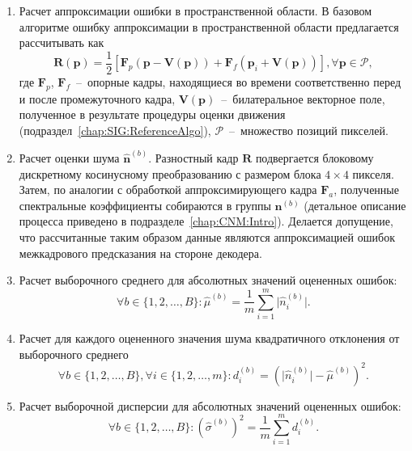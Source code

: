 \begin{enumerate}
  \item Расчет аппроксимации ошибки в пространственной области. В базовом алгоритме ошибку аппроксимации в пространственной области предлагается рассчитывать как 
  \begin{equation*}
    \mathbf{R}(\mathbf{p}) = \frac{1}{2} \left[ \mathbf{F}_p(\mathbf{p}-\mathbf{V}(\mathbf{p})) + \mathbf{F}_f(\mathbf{p}_i+\mathbf{V}(\mathbf{p}))\right], \forall \mathbf{p} \in \mathcal{P},
    \label{eq:NoiseEstimation}
  \end{equation*}  
  где $\mathbf{F}_p$, $\mathbf{F}_f$~--~опорные кадры, находящиеся во времени соответственно перед и после промежуточного кадра, $\mathbf{V}(\mathbf{p})$~--~билатеральное векторное поле, полученное в результате процедуры оценки движения (подраздел~\ref{chap:SIG:ReferenceAlgo}), $\mathcal{P}$~--~множество позиций пикселей.
  
  \item Расчет оценки шума $\hat{\mathbf{n}}^{(b)}$. Разностный кадр $\mathbf{R}$ подвергается блоковому дискретному косинусному преобразованию с размером блока $4 \times 4$ пикселя. Затем, по аналогии с обработкой аппроксимирующего кадра $\mathbf{F}_a$, полученные спектральные коэффициенты собираются в группы $\mathbf{n}^{(b)}$ (детальное описание процесса приведено в подразделе~\ref{chap:CNM:Intro}). Делается допущение, что рассчитанные таким образом данные являются аппроксимацией ошибок межкадрового предсказания на стороне декодера.
  
  \item Расчет выборочного среднего для абсолютных значений оцененных ошибок:
  \begin{equation*}
  \forall b \in \{1,2,\ldots, B\}: \hat{\mu}^{(b)} = \frac{1}{m}  \sum\limits_{i=1}^{m} \vert \hat{n}^{(b)}_i \vert.
  \end{equation*}
  
  \item Расчет для каждого оцененного значения шума квадратичного отклонения от выборочного среднего
  \begin{equation*}
  \forall b \in \{1,2,\ldots, B\}, \forall i \in \{1,2,\ldots, m\}: d^{(b)}_i = \left( \vert \hat{n}^{(b)}_i \vert - \hat{\mu}^{(b)} \right)^2.
  \end{equation*}
  
  \item Расчет выборочной дисперсии для абсолютных значений оцененных ошибок:
  \begin{equation*}
  \forall b \in \{1,2,\ldots, B\}: \left(\hat{\sigma}^{(b)}\right)^2 = \frac{1}{m} \sum\limits_{i=1}^{m} d^{(b)}_i.
  \end{equation*}
  

\end{enumerate}
